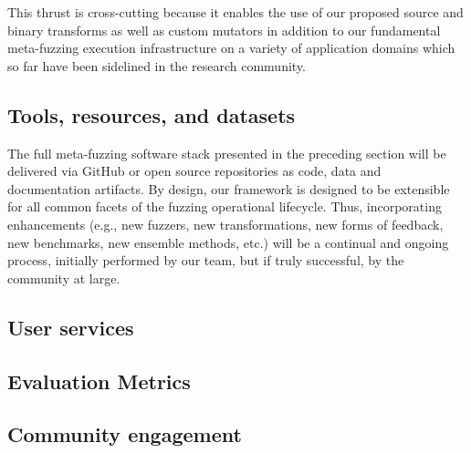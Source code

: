 This thrust is cross-cutting because it enables the use of our proposed source and binary 
transforms as well as custom mutators in addition to our fundamental meta-fuzzing execution
infrastructure on a variety of application domains which so far have been 
sidelined in the research community.

\subsection{Tools, resources, and datasets}
The full meta-fuzzing software stack presented in the preceding section will be delivered via GitHub or open source repositories as code, data and documentation artifacts. By design, our framework is designed to be extensible for all common facets of the fuzzing operational lifecycle. Thus, incorporating enhancements (e.g., new fuzzers, new transformations, new forms of feedback, new benchmarks, new ensemble methods, etc.) will be a continual and ongoing process, initially performed by our team, but if truly successful, by the community at large. 


\subsection{User services}
\label{sec:user-services}


\subsection{Evaluation Metrics}


\subsection{Community engagement}


